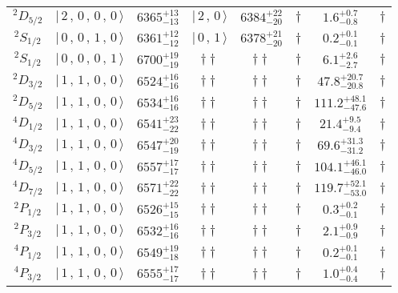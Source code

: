 \begin{tabular}{c| c c c c c c c}
$^{2}D_{5/2}$ & $\vert \,2\,,\,0\,,\,0\,,\,0 \,\rangle $ & $6365^{+13}_{-13}$ & $\vert \,2\,,\,0 \,\rangle$ & $6384^{+22}_{-20}$ & $\dagger$ & $1.6^{+0.7}_{-0.8}$ & $\dagger$ \\ 
$^{2}S_{1/2}$ & $\vert \,0\,,\,0\,,\,1\,,\,0 \,\rangle $ & $6361^{+12}_{-12}$ & $\vert \,0\,,\,1 \,\rangle$ & $6378^{+21}_{-20}$ & $\dagger$ & $0.2^{+0.1}_{-0.1}$ & $\dagger$ \\ 
$^{2}S_{1/2}$ & $\vert \,0\,,\,0\,,\,0\,,\,1 \,\rangle $ & $6700^{+19}_{-19}$ & $\dagger\dagger$ & $\dagger\dagger$ & $\dagger$ & $6.1^{+2.6}_{-2.7}$ & $\dagger$ \\ 
$^{2}D_{3/2}$ & $\vert \,1\,,\,1\,,\,0\,,\,0 \,\rangle $ & $6524^{+16}_{-16}$ & $\dagger\dagger$ & $\dagger\dagger$ & $\dagger$ & $47.8^{+20.7}_{-20.8}$ & $\dagger$ \\ 
$^{2}D_{5/2}$ & $\vert \,1\,,\,1\,,\,0\,,\,0 \,\rangle $ & $6534^{+16}_{-16}$ & $\dagger\dagger$ & $\dagger\dagger$ & $\dagger$ & $111.2^{+48.1}_{-47.6}$ & $\dagger$ \\ 
$^{4}D_{1/2}$ & $\vert \,1\,,\,1\,,\,0\,,\,0 \,\rangle $ & $6541^{+23}_{-22}$ & $\dagger\dagger$ & $\dagger\dagger$ & $\dagger$ & $21.4^{+9.5}_{-9.4}$ & $\dagger$ \\ 
$^{4}D_{3/2}$ & $\vert \,1\,,\,1\,,\,0\,,\,0 \,\rangle $ & $6547^{+20}_{-19}$ & $\dagger\dagger$ & $\dagger\dagger$ & $\dagger$ & $69.6^{+31.3}_{-31.2}$ & $\dagger$ \\ 
$^{4}D_{5/2}$ & $\vert \,1\,,\,1\,,\,0\,,\,0 \,\rangle $ & $6557^{+17}_{-17}$ & $\dagger\dagger$ & $\dagger\dagger$ & $\dagger$ & $104.1^{+46.1}_{-46.0}$ & $\dagger$ \\ 
$^{4}D_{7/2}$ & $\vert \,1\,,\,1\,,\,0\,,\,0 \,\rangle $ & $6571^{+22}_{-22}$ & $\dagger\dagger$ & $\dagger\dagger$ & $\dagger$ & $119.7^{+52.1}_{-53.0}$ & $\dagger$ \\ 
$^{2}P_{1/2}$ & $\vert \,1\,,\,1\,,\,0\,,\,0 \,\rangle $ & $6526^{+15}_{-15}$ & $\dagger\dagger$ & $\dagger\dagger$ & $\dagger$ & $0.3^{+0.2}_{-0.1}$ & $\dagger$ \\ 
$^{2}P_{3/2}$ & $\vert \,1\,,\,1\,,\,0\,,\,0 \,\rangle $ & $6532^{+16}_{-16}$ & $\dagger\dagger$ & $\dagger\dagger$ & $\dagger$ & $2.1^{+0.9}_{-0.9}$ & $\dagger$ \\ 
$^{4}P_{1/2}$ & $\vert \,1\,,\,1\,,\,0\,,\,0 \,\rangle $ & $6549^{+19}_{-18}$ & $\dagger\dagger$ & $\dagger\dagger$ & $\dagger$ & $0.2^{+0.1}_{-0.1}$ & $\dagger$ \\ 
$^{4}P_{3/2}$ & $\vert \,1\,,\,1\,,\,0\,,\,0 \,\rangle $ & $6555^{+17}_{-17}$ & $\dagger\dagger$ & $\dagger\dagger$ & $\dagger$ & $1.0^{+0.4}_{-0.4}$ & $\dagger$ \\ 

\end{tabular}
